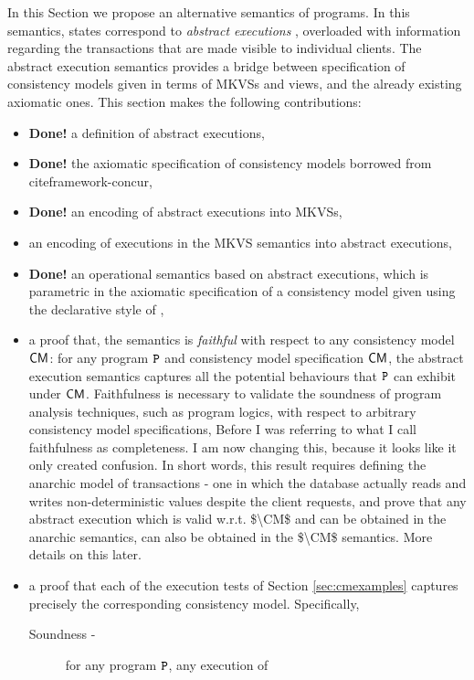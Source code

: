 In this Section we propose an alternative 
semantics of programs. In this semantics, states 
correspond to \emph{abstract executions} \cite{framework-concur}, 
overloaded with information regarding the transactions that are made 
visible to individual clients. 
The abstract execution semantics provides a bridge between specification 
of consistency models given in terms of MKVSs and views, and the already 
existing axiomatic ones. This section makes the following contributions: 
\begin{itemize}
\item \textbf{Done!} a definition of abstract executions, 
\item \textbf{Done!} the axiomatic specification of consistency models borrowed from cite{framework-concur},
\item \textbf{Done!} an encoding of abstract executions into MKVSs, 
\item an encoding of executions in the MKVS semantics into abstract 
executions, 
\item \textbf{Done!} an operational semantics based on abstract executions, 
which is parametric in the axiomatic specification of a consistency model given using 
the declarative style of \cite{framework-concur,SIanalysis,laws}, 
\item a proof that, the semantics is \emph{faithful} with respect to any consistency model $\CM$: 
for any program $\texttt{P}$ and consistency model specification $\CM$, 
the abstract execution semantics captures all the potential behaviours that $\texttt{P}$ can 
exhibit under $\CM$. Faithfulness is necessary to validate the soundness of 
program analysis techniques, such as program logics, with respect to arbitrary consistency model 
specifications,
\ac{Before I was referring to what I call faithfulness as completeness. I am now changing this, because 
it looks like it only created confusion. In short words, this result requires defining the anarchic model 
of transactions - one in which the database actually reads and writes non-deterministic values 
despite the client requests, and prove that any abstract execution which is 
valid w.r.t. $\CM$ and can be obtained in the anarchic semantics, can also be obtained 
in the $\CM$ semantics. More details on this later.} 
\item a proof that each of the execution tests of Section \ref{sec:cmexamples}
captures precisely the corresponding consistency model. Specifically,
\begin{description}
\item[Soundness - ] for any program $\texttt{P}$, any execution of 

\end{description}
\end{itemize}

